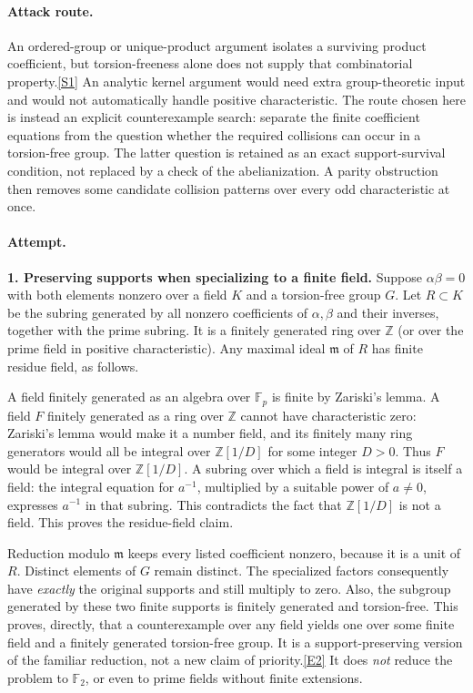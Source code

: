 \documentclass[11pt,a4paper]{article}
\newcommand{\Z}{\mathbb{Z}}
\newcommand{\F}{\mathbb{F}}
\newcommand{\sref}[2]{\hyperlink{source:#1:#2}{[S#2]}}
\newcommand{\eref}[2]{\hyperlink{extra:#1:#2}{[E#2]}}
\begin{document}
\paragraph{Attack route.}
An ordered-group or unique-product argument isolates a surviving product
coefficient, but torsion-freeness alone does not supply that combinatorial
property.\sref{statement}{1}
An analytic kernel argument would need extra group-theoretic input and
would not automatically handle positive characteristic. The route chosen
here is instead an explicit counterexample search: separate the finite
coefficient equations from the question whether the required collisions
can occur in a torsion-free group. The latter question is retained as an
exact support-survival condition, not replaced by a check of the
abelianization. A parity obstruction then removes some candidate collision
patterns over every odd characteristic at once.

\paragraph{Attempt.}
\textbf{1. Preserving supports when specializing to a finite field.}
Suppose $\alpha\beta=0$ with both elements nonzero over a field $K$ and a
torsion-free group $G$. Let $R\subset K$ be the subring generated by all
nonzero coefficients of $\alpha,\beta$ and their inverses, together with
the prime subring. It is a finitely generated ring over $\Z$ (or over the
prime field in positive characteristic). Any maximal ideal $\mathfrak m$
of $R$ has finite residue field, as follows.

A field finitely generated as an algebra over $\F_p$ is finite by
Zariski's lemma. A field $F$ finitely generated as a ring over $\Z$ cannot
have characteristic zero: Zariski's lemma would make it a number field,
and its finitely many ring generators would all be integral over
$\Z[1/D]$ for some integer $D>0$. Thus $F$ would be integral over
$\Z[1/D]$. A subring over which a field is integral is itself a field:
the integral equation for $a^{-1}$, multiplied by a suitable power of
$a\ne0$, expresses $a^{-1}$ in that subring. This contradicts the fact
that $\Z[1/D]$ is not a field. This proves the residue-field claim.

Reduction modulo $\mathfrak m$ keeps every listed coefficient nonzero,
because it is a unit of $R$. Distinct elements of $G$ remain distinct.
The specialized factors consequently have \emph{exactly} the original
supports and still multiply to zero. Also, the subgroup generated by
these two finite supports is finitely generated and torsion-free.
This proves, directly, that a counterexample over any field yields one
over some finite field and a finitely generated torsion-free group.
It is a support-preserving version of the familiar reduction, not a new
claim of priority.\eref{statement}{2}
It does \emph{not} reduce the problem to $\F_2$, or even to prime fields
without finite extensions.
\end{document}
